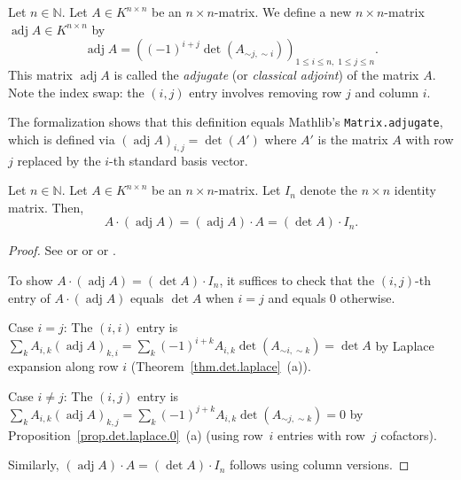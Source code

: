 \begin{definition}
\label{def.det.adj}
\leantarget
\leanok
Let $n \in \mathbb{N}$. Let $A \in K^{n \times n}$ be an $n \times n$-matrix.
We define a new $n \times n$-matrix $\operatorname{adj} A \in K^{n \times n}$ by
\[
  \operatorname{adj} A
  = \left( (-1)^{i+j} \det(A_{\sim j, \sim i}) \right)_{1 \leq i \leq n,\; 1 \leq j \leq n}.
\]
This matrix $\operatorname{adj} A$ is called the \emph{adjugate} (or
\emph{classical adjoint}) of the matrix $A$.
Note the index swap: the $(i,j)$ entry involves removing row $j$ and column $i$.

The formalization shows that this definition equals Mathlib's
\texttt{Matrix.adjugate}, which is defined via
$(\operatorname{adj} A)_{i,j} = \det(A')$
where $A'$ is the matrix $A$ with row $j$ replaced by the $i$-th standard basis vector.
\end{definition}

\begin{theorem}
\label{thm.det.adj.inverse}
\leantarget
\leanok
Let $n \in \mathbb{N}$. Let $A \in K^{n \times n}$ be an $n \times n$-matrix.
Let $I_n$ denote the $n \times n$ identity matrix. Then,
\[
  A \cdot (\operatorname{adj} A) = (\operatorname{adj} A) \cdot A
  = (\det A) \cdot I_n.
\]
\end{theorem}

\begin{proof}
See \cite[Theorem 6.100]{detnotes} or \cite[Lemma 4.7.9]{Ford21} or
\cite[Theorem 9.50]{Loehr-BC} or \cite[Proposition B.28]{Strick13}.

To show $A \cdot (\operatorname{adj} A) = (\det A) \cdot I_n$, it suffices to
check that the $(i,j)$-th entry of $A \cdot (\operatorname{adj} A)$ equals
$\det A$ when $i = j$ and equals $0$ otherwise.

Case $i = j$: The $(i,i)$ entry is
$\sum_k A_{i,k} (\operatorname{adj} A)_{k,i}
= \sum_k (-1)^{i+k} A_{i,k} \det(A_{\sim i, \sim k}) = \det A$
by Laplace expansion along row $i$ (Theorem~\ref{thm.det.laplace}~(a)).

Case $i \neq j$: The $(i,j)$ entry is
$\sum_k A_{i,k} (\operatorname{adj} A)_{k,j}
= \sum_k (-1)^{j+k} A_{i,k} \det(A_{\sim j, \sim k}) = 0$
by Proposition~\ref{prop.det.laplace.0}~(a) (using row~$i$ entries with row~$j$ cofactors).

Similarly, $(\operatorname{adj} A) \cdot A = (\det A) \cdot I_n$ follows
using column versions.
\end{proof}

